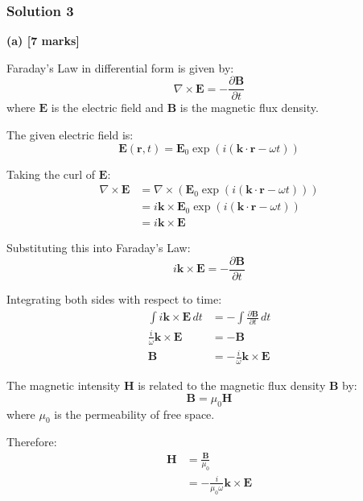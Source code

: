\documentclass{article}
\begin{document}
\subsubsection{Solution 3}
\textbf{(a) [7 marks]}

Faraday's Law in differential form is given by:
\begin{equation*}
\nabla \times \mathbf{E} = -\frac{\partial \mathbf{B}}{\partial t}
\end{equation*}
where $\mathbf{E}$ is the electric field and $\mathbf{B}$ is the magnetic flux density.

The given electric field is:
\begin{equation*}
\mathbf{E}(\mathbf{r}, t) = \mathbf{E}_0 \exp(i (\mathbf{k} \cdot \mathbf{r} - \omega t))
\end{equation*}

Taking the curl of $\mathbf{E}$:
\begin{align*}
\nabla \times \mathbf{E} &= \nabla \times (\mathbf{E}_0 \exp(i (\mathbf{k} \cdot \mathbf{r} - \omega t))) \\
&= i \mathbf{k} \times \mathbf{E}_0 \exp(i (\mathbf{k} \cdot \mathbf{r} - \omega t)) \\
&= i \mathbf{k} \times \mathbf{E}
\end{align*}

Substituting this into Faraday's Law:
\begin{equation*}
i \mathbf{k} \times \mathbf{E} = -\frac{\partial \mathbf{B}}{\partial t}
\end{equation*}

Integrating both sides with respect to time:
\begin{align*}
\int i \mathbf{k} \times \mathbf{E} \, dt &= -\int \frac{\partial \mathbf{B}}{\partial t} \, dt \\
\frac{i}{\omega} \mathbf{k} \times \mathbf{E} &= -\mathbf{B} \\
\mathbf{B} &= -\frac{i}{\omega} \mathbf{k} \times \mathbf{E}
\end{align*}

The magnetic intensity $\mathbf{H}$ is related to the magnetic flux density $\mathbf{B}$ by:
\begin{equation*}
\mathbf{B} = \mu_0 \mathbf{H}
\end{equation*}
where $\mu_0$ is the permeability of free space.

Therefore:
\begin{align*}
\mathbf{H} &= \frac{\mathbf{B}}{\mu_0} \\
&= -\frac{i}{\mu_0 \omega} \mathbf{k} \times \mathbf{E}
\end{align*}
\end{document}

